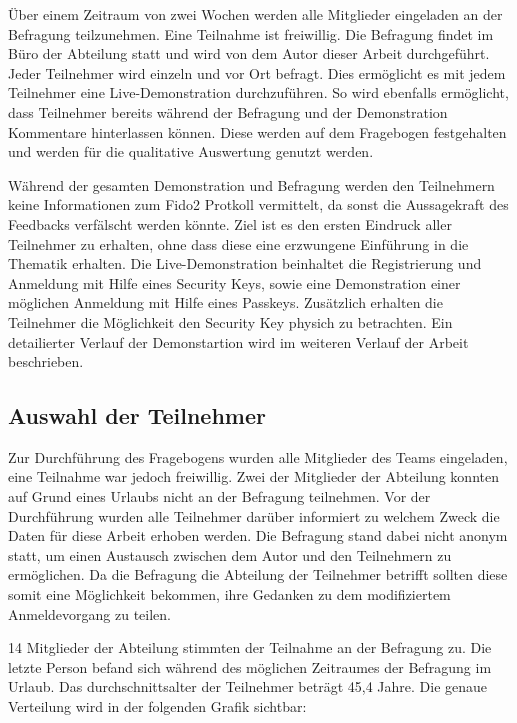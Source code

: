Über einem Zeitraum von zwei Wochen werden alle Mitglieder eingeladen an der Befragung teilzunehmen. Eine Teilnahme ist freiwillig. Die Befragung findet im Büro der Abteilung statt und wird von dem Autor dieser Arbeit durchgeführt. Jeder Teilnehmer wird einzeln und vor Ort befragt. Dies ermöglicht es mit jedem Teilnehmer eine Live-Demonstration durchzuführen. So wird ebenfalls ermöglicht, dass Teilnehmer bereits während der Befragung und der Demonstration Kommentare hinterlassen können. Diese werden auf dem Fragebogen festgehalten und werden für die qualitative Auswertung genutzt werden.

Während der gesamten Demonstration und Befragung werden den Teilnehmern keine Informationen zum Fido2 Protkoll vermittelt, da sonst die Aussagekraft des Feedbacks verfälscht werden könnte. Ziel ist es den ersten Eindruck aller Teilnehmer zu erhalten, ohne dass diese eine erzwungene Einführung in die Thematik erhalten. Die Live-Demonstration beinhaltet die Registrierung und Anmeldung mit Hilfe eines Security Keys, sowie eine Demonstration einer möglichen Anmeldung mit Hilfe eines Passkeys. Zusätzlich erhalten die Teilnehmer die Möglichkeit den Security Key physich zu betrachten. Ein detailierter Verlauf der Demonstartion wird im weiteren Verlauf der Arbeit beschrieben.

\subsection{Auswahl der Teilnehmer}
Zur Durchführung des Fragebogens wurden alle Mitglieder des Teams eingeladen, eine Teilnahme war jedoch freiwillig. Zwei der Mitglieder der Abteilung konnten auf Grund eines Urlaubs nicht an der Befragung teilnehmen. Vor der Durchführung wurden alle Teilnehmer darüber informiert zu welchem Zweck die Daten für diese Arbeit erhoben werden. Die Befragung stand dabei nicht anonym statt, um einen Austausch zwischen dem Autor und den Teilnehmern zu ermöglichen. Da die Befragung die Abteilung der Teilnehmer betrifft sollten diese somit eine Möglichkeit bekommen, ihre Gedanken zu dem modifiziertem Anmeldevorgang zu teilen.

14 Mitglieder der Abteilung stimmten der Teilnahme an der Befragung zu. Die letzte Person befand sich während des möglichen Zeitraumes der Befragung im Urlaub. Das durchschnittsalter der Teilnehmer beträgt 45,4 Jahre. Die genaue Verteilung wird in der folgenden Grafik sichtbar:

